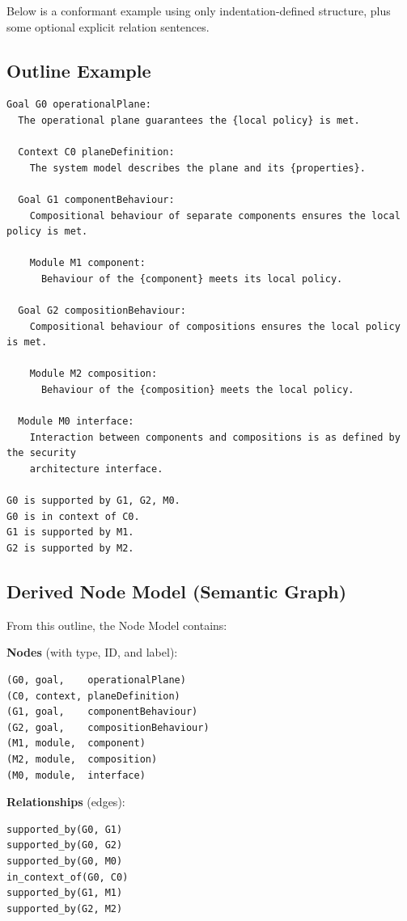 \documentclass[11pt]{article}
\begin{document}
Below is a conformant example using only indentation-defined structure, plus some optional explicit relation sentences.

\subsection{Outline Example}

\begin{verbatim}
Goal G0 operationalPlane:
  The operational plane guarantees the {local policy} is met.

  Context C0 planeDefinition:
    The system model describes the plane and its {properties}.

  Goal G1 componentBehaviour:
    Compositional behaviour of separate components ensures the local policy is met.

    Module M1 component:
      Behaviour of the {component} meets its local policy.

  Goal G2 compositionBehaviour:
    Compositional behaviour of compositions ensures the local policy is met.

    Module M2 composition:
      Behaviour of the {composition} meets the local policy.

  Module M0 interface:
    Interaction between components and compositions is as defined by the security
    architecture interface.

G0 is supported by G1, G2, M0.
G0 is in context of C0.
G1 is supported by M1.
G2 is supported by M2.
\end{verbatim}

\subsection{Derived Node Model (Semantic Graph)}

From this outline, the Node Model contains:

\textbf{Nodes} (with type, ID, and label):
\begin{verbatim}
(G0, goal,    operationalPlane)
(C0, context, planeDefinition)
(G1, goal,    componentBehaviour)
(G2, goal,    compositionBehaviour)
(M1, module,  component)
(M2, module,  composition)
(M0, module,  interface)
\end{verbatim}

\textbf{Relationships} (edges):
\begin{verbatim}
supported_by(G0, G1)
supported_by(G0, G2)
supported_by(G0, M0)
in_context_of(G0, C0)
supported_by(G1, M1)
supported_by(G2, M2)
\end{verbatim}
\end{document}
